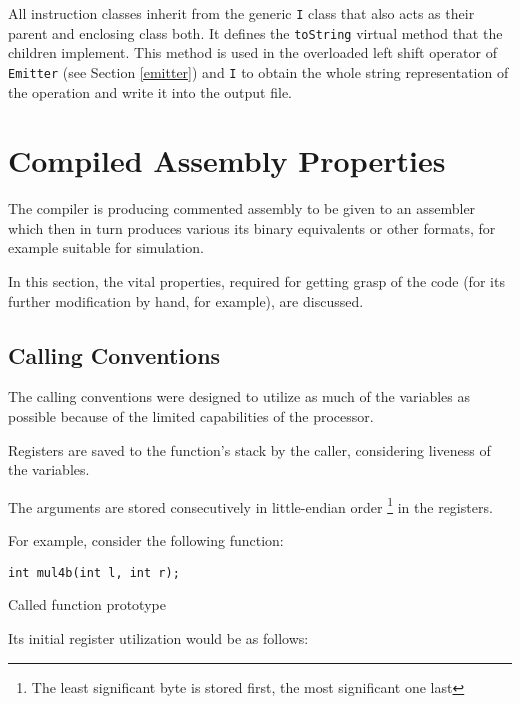     All instruction classes inherit from the generic \texttt{I} class that also acts as their parent and enclosing class both. It defines the \texttt{toString} virtual method that the children implement. This method is used in the overloaded left shift operator of \texttt{Emitter} (see Section \ref{emitter}) and \texttt{I} to obtain the whole string representation of the operation and write it into the output file.

    

    \section{Compiled Assembly Properties}

    The compiler is producing commented assembly to be given to an assembler which then in turn produces various its binary equivalents or other formats, for example suitable for simulation.

    In this section, the vital properties, required for getting grasp of the code (for its further modification by hand, for example), are discussed.

        \subsection{Calling Conventions}

        The calling conventions were designed to utilize as much of the variables as possible because of the limited capabilities of the processor.

        Registers are saved to the function's stack by the caller, considering liveness of the variables.

        The arguments are stored consecutively in little-endian order \footnote{The least significant byte is stored first, the most significant one last} in the registers.

        For example, consider the following function:

        \begin{listing}
        \centering
        \texttt{int mul4b(int l, int r);}
        \caption{Called function prototype}\label{lst:func}
        \end{listing}

        Its initial register utilization would be as follows:

